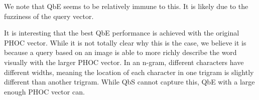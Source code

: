 \documentclass[ms,electronic,twosidetoc,letterpaper,chaptercenter,parttop,lof,lot]{byumsphd}
\begin{document}
We note that QbE seems to be relatively immune to this. It is likely due to the fuzziness of the query vector.


It is interesting that the best QbE performance is achieved with the original PHOC vector. While it is not totally clear why this is the case, we believe it is because a query based on an image is able to more richly describe the word visually with the larger PHOC vector. In an n-gram, different characters have different widths, meaning the location of each character in one trigram is slightly different than another trigram. While QbS cannot capture this, QbE with a large enough PHOC vector can.


\end{document}
